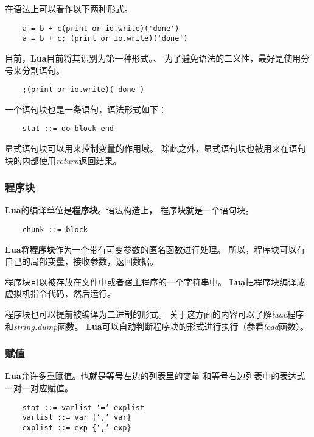 \documentclass{ctexart}
\begin{document}
在语法上可以看作以下两种形式。

\lstset{language=C}
\begin{lstlisting}
	a = b + c(print or io.write)('done') 
	a = b + c; (print or io.write)('done')
\end{lstlisting}

目前，\textbf{Lua}目前将其识别为第一种形式。、
为了避免语法的二义性，最好是使用分号来分割语句。

\lstset{language=C}
\begin{lstlisting}
	;(print or io.write)('done')
\end{lstlisting}

一个语句块也是一条语句，语法形式如下：

\lstset{language=C}
\begin{lstlisting}
	stat ::= do block end
\end{lstlisting}

显式语句块可以用来控制变量的作用域。
除此之外，显式语句块也被用来在语句块的内部使用\emph{return}返回结果。

\subsubsection{程序块}

\textbf{Lua}的编译单位是\textbf{程序块}。语法构造上，
程序块就是一个语句块。

\lstset{language=C}
\begin{lstlisting}
	chunk ::= block
\end{lstlisting}

\textbf{Lua}将\textbf{程序块}作为一个带有可变参数的匿名函数进行处理。
所以，程序块可以有自己的局部变量，接收参数，返回数据。

程序块可以被存放在文件中或者宿主程序的一个字符串中。
\textbf{Lua}把程序块编译成虚拟机指令代码，然后运行。

程序块也可以提前被编译为二进制的形式。
关于这方面的内容可以了解\emph{luac}程序和\emph{string.dump}函数。
\textbf{Lua}可以自动判断程序块的形式进行执行（参看\emph{load}函数）。

\subsubsection{赋值}

\textbf{Lua}允许多重赋值。也就是等号左边的列表里的变量
和等号右边列表中的表达式一对一对应赋值。

\lstset{language=C}
\begin{lstlisting}
	stat ::= varlist ‘=’ explist
	varlist ::= var {‘,’ var}
	explist ::= exp {‘,’ exp}
\end{lstlisting}
\end{document}
